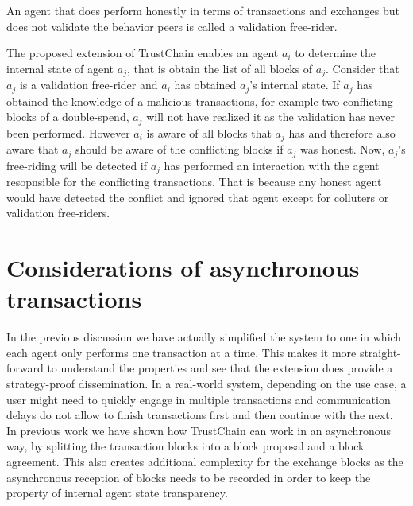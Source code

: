 \begin{defn}
    An agent that does perform honestly in terms of transactions and exchanges but does not validate
    the behavior peers is called a validation free-rider.
\end{defn}

The proposed extension of TrustChain enables an agent $a_i$ to determine the internal state of agent
$a_j$, that is obtain the list of all blocks of $a_j$. Consider that $a_j$ is a validation free-rider
and $a_i$ has obtained $a_j$'s internal state. If $a_j$ has obtained the knowledge of a malicious 
transactions, for example two conflicting blocks of a double-spend, $a_j$ will not have realized it 
as the validation has never been performed. However $a_i$ is aware of all blocks that $a_j$ has and 
therefore also aware that $a_j$ should be aware of the conflicting blocks if $a_j$ was honest. Now, 
$a_j$'s free-riding will be detected if $a_j$ has performed an interaction with the agent resopnsible
for the conflicting transactions. That is because any honest agent would have detected the conflict 
and ignored that agent except for colluters or validation free-riders. 

\section{Considerations of asynchronous transactions}
In the previous discussion we have actually simplified the system to one in which each agent only 
performs one transaction at a time. This makes it more straight-forward to understand the properties
and see that the extension does provide a strategy-proof dissemination. In a real-world system,
depending on the use case, a user might need to quickly engage in multiple transactions and 
communication delays do not allow to finish transactions first and then continue with the next. In 
previous work we have shown how TrustChain can work in an asynchronous way, by splitting the 
transaction blocks into a block proposal and a block agreement. This also creates additional 
complexity for the exchange blocks as the asynchronous reception of blocks needs to be recorded in
order to keep the property of internal agent state transparency.

\begin{defn}
\end{defn}
